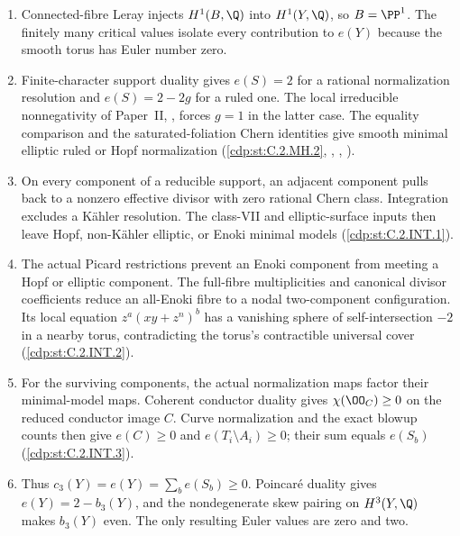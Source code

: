 \RungOne
\begin{enumerate}[label=\arabic*.,leftmargin=*]
\item Connected-fibre Leray injects $H^1(B,\Q)$ into
$H^1(Y,\Q)$, so $B=\PP^1$.  The finitely many critical
values isolate every contribution to $e(Y)$ because the
smooth torus has Euler number zero.
\item Finite-character support duality gives $e(S)=2$ for a
rational normalization resolution and $e(S)=2-2g$ for a ruled
one. The local irreducible nonnegativity of Paper~II,
, forces $g=1$ in the latter case.
The equality comparison and the saturated-foliation Chern
identities give smooth minimal elliptic ruled or Hopf
normalization (\ref{cdp:st:C.2.MH.2}, ,
, ).
\item On every component of a reducible support, an adjacent
component pulls back to a nonzero effective divisor with
zero rational Chern class.  Integration excludes a K\"ahler
resolution.  The class-VII and elliptic-surface inputs then
leave Hopf, non-K\"ahler elliptic, or Enoki minimal models
(\ref{cdp:st:C.2.INT.1}).
\item The actual Picard restrictions prevent an Enoki
component from meeting a Hopf or elliptic component.
The full-fibre multiplicities and canonical divisor
coefficients reduce an all-Enoki fibre to a nodal
two-component configuration.  Its local equation
$z^a(xy+z^n)^b$ has a vanishing sphere of self-intersection
$-2$ in a nearby torus, contradicting the torus's
contractible universal cover (\ref{cdp:st:C.2.INT.2}).
\item For the surviving components, the actual normalization
maps factor their minimal-model maps.  Coherent conductor
duality gives $\chi(\OO_{C})\ge0$ on the reduced conductor
image $C$.  Curve normalization and the exact blowup counts
then give $e(C)\ge0$ and
$e(T_i\setminus A_i)\ge0$; their sum equals $e(S_b)$
(\ref{cdp:st:C.2.INT.3}).
\item Thus $c_3(Y)=e(Y)=\sum_b e(S_b)\ge0$.
Poincar\'e duality gives $e(Y)=2-b_3(Y)$, and the
nondegenerate skew pairing on $H^3(Y,\Q)$ makes $b_3(Y)$
even.  The only resulting Euler values are zero and two.
\end{enumerate}

